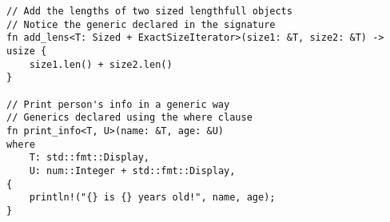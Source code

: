 \documentclass[12pt]{article}
\begin{document}
\singlespacing{}
\begin{verbatim}
// Add the lengths of two sized lengthfull objects
// Notice the generic declared in the signature
fn add_lens<T: Sized + ExactSizeIterator>(size1: &T, size2: &T) -> usize {
    size1.len() + size2.len()
}

// Print person's info in a generic way
// Generics declared using the where clause
fn print_info<T, U>(name: &T, age: &U)
where
    T: std::fmt::Display,
    U: num::Integer + std::fmt::Display,
{
    println!("{} is {} years old!", name, age);
}
\end{verbatim}
\doublespacing{}

\makeworkscited{}
\end{document}
